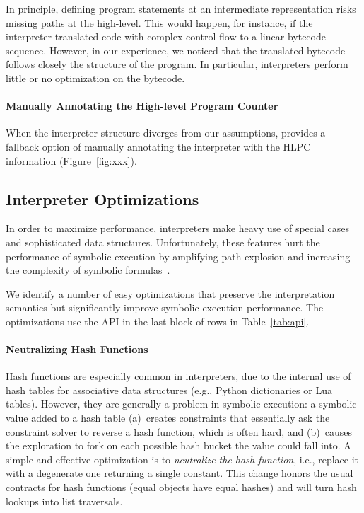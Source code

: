 In principle, defining program statements at an intermediate representation risks missing paths at the high-level.
%
This would happen, for instance, if the interpreter translated code with complex control flow to a linear bytecode sequence.
%
However, in our experience, we noticed that the translated bytecode follows closely the structure of the program.
%
In particular, interpreters perform little or no optimization on the bytecode.

\paragraph{Manually Annotating the High-level Program Counter}

When the interpreter structure diverges from our assumptions, \chef provides a fallback option of manually annotating the interpreter with the HLPC information (Figure~\ref{fig:xxx}).

\subsection{Interpreter Optimizations}
\label{sec:chef:optimzeforsymbex}

In order to maximize performance, interpreters make heavy use of special cases and sophisticated data structures.  Unfortunately, these features hurt the performance of symbolic execution by amplifying path explosion and increasing the complexity of symbolic formulas~\cite{overify}.

We identify a number of easy optimizations that preserve the interpretation semantics but significantly improve symbolic execution performance.  The optimizations use the \chef API in the last block of rows in Table~\ref{tab:api}.

\paragraph{Neutralizing Hash Functions}

Hash functions are especially common in interpreters, due to the internal use of hash tables for associative data structures (e.g., Python dictionaries or Lua tables).  However, they are generally a problem in symbolic execution: a symbolic value added to a hash table (a)~creates constraints that essentially ask the constraint solver to reverse a hash function, which is often hard, and (b)~causes the exploration to fork on each possible hash bucket the value could fall into.
%
A simple and effective optimization is to \emph{neutralize the hash function}, i.e., replace it with a degenerate one returning a single constant. This change honors the usual contracts for hash functions (equal objects have equal hashes) and will turn hash lookups into list traversals.

